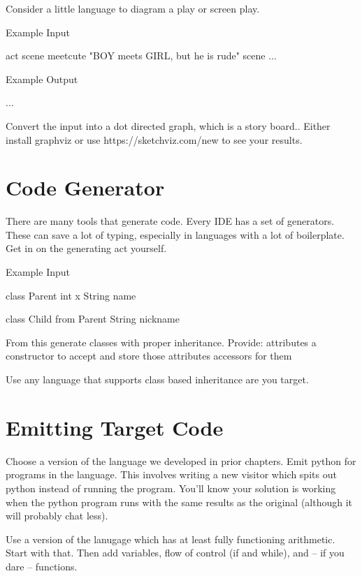 Consider a little language to diagram a play or screen play.

Example Input

    act {
        scene meetcute "BOY meets GIRL, but he is rude"
        scene ...
    }

Example Output

...

Convert the input into a dot directed graph, which is a story board..
Either install graphviz or use https://sketchviz.com/new to see
your results.

\section{Code Generator}

There are many tools that generate code. Every IDE has a set of
generators. These can save a lot of typing, especially in languages
with a lot of boilerplate. Get in on the generating act yourself.

Example Input

    class Parent {
        int x
        String name
    }

    class Child from Parent {
        String nickname
    }

From this generate classes with proper inheritance. Provide:
    attributes
    a constructor to accept and store those attributes
    accessors for them

Use any language that supports class based inheritance are you target.

\section{Emitting Target Code}

Choose a version of the language we developed in prior chapters.
Emit python for programs in the language. This involves writing a new
visitor which spits out python instead of running the program.
You'll know your solution is working when the python program runs
with the same results as the original (although it will probably chat less).

Use a version of the lanugage which has at least fully functioning
arithmetic. Start with that. Then add variables, flow of control (if
and while), and -- if you dare -- functions.
